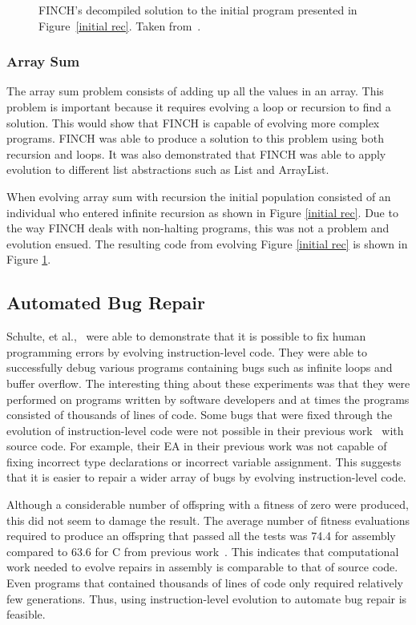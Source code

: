 \documentclass{sig-alternate}
\begin{document}
\begin{figure}
\centering
{}
\caption{FINCH's decompiled solution to the initial program presented in Figure~\ref{initial rec}. Taken from~\cite{FINCH:2011}.}
\label{final rec}
\end{figure}

\subsubsection{Array Sum}
The array sum problem consists of adding up all the values in an array. This problem is important because it requires evolving a loop or recursion to find a solution. This would show that FINCH is capable of evolving more complex programs. FINCH was able to produce a solution to this problem using both recursion and loops. It was also demonstrated that FINCH was able to apply evolution to different list abstractions such as List and ArrayList.

When evolving array sum with recursion the initial population consisted of an individual who entered infinite recursion as shown in Figure \ref{initial rec}. Due to the way FINCH deals with non-halting programs, this was not a problem and evolution ensued. The resulting code from evolving Figure \ref{initial rec} is shown in Figure \ref{final rec}.


\subsection{Automated Bug Repair}

Schulte, et al.,~\cite{Assembly:2010} were able to demonstrate that it is possible to fix human programming errors by evolving instruction-level code. They were able to successfully debug various programs containing bugs such as infinite loops and buffer overflow. The interesting thing about these experiments was that they were performed on programs written by software developers and at times the programs consisted of thousands of lines of code. Some bugs that were fixed through the evolution of instruction-level code were not possible in their previous work~\cite{Forrest:2009} with source code. For example, their EA in their previous work was not capable of fixing incorrect type declarations or incorrect variable assignment. This suggests that it is easier to repair a wider array of bugs by evolving instruction-level code.

Although a considerable number of offspring with a fitness of zero were produced, this did not seem to damage the result. The average number of fitness evaluations required to produce an offspring that passed all the tests was 74.4 for assembly compared to 63.6 for C from previous work~\cite{Forrest:2009}. This indicates that computational work needed to evolve repairs in assembly is comparable to that of source code. Even programs that contained thousands of lines of code only required relatively few generations. Thus, using instruction-level evolution to automate bug repair is feasible.
 
\end{document}
